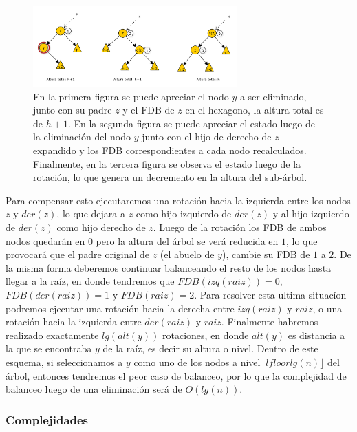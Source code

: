\begin{figure}
 \centering
 \includegraphics[width=0.70\textwidth]{graficos/PeorCasoEliminacionAVL.pdf}
 \caption*{\newline \footnotesize En la primera figura se puede apreciar el nodo $y$ a ser eliminado, junto con su padre $z$ y el FDB de $z$ en el hexagono, la altura total es de $h+1$. En la segunda figura se puede apreciar el estado luego de la eliminaci\'on del nodo $y$ junto con el hijo de derecho de $z$ expandido y los FDB correspondientes a cada nodo recalculados. Finalmente, en la tercera figura se observa el estado luego de la rotaci\'on, lo que genera un decremento en la altura del sub-\'arbol.}
\end{figure}

Para compensar esto ejecutaremos una rotaci\'on hacia la izquierda entre los nodos $z$ y $der(z)$, lo que dejara a $z$ como hijo izquierdo de $der(z)$ y al hijo izquierdo de $der(z)$ como hijo derecho de $z$. Luego de la rotaci\'on los FDB de ambos nodos quedar\'an en $0$ pero la altura del \'arbol se ver\'a reducida en $1$, lo que provocar\'a que el padre original de $z$ (el abuelo de $y$), cambie su FDB de $1$ a $2$. De la misma forma deberemos continuar balanceando el resto de los nodos hasta llegar a la ra\'iz, en donde tendremos que $FDB(izq(raiz)) = 0$, $FDB(der(raiz)) = 1$ y $FDB(raiz) = 2$. Para resolver esta ultima situac\'ion podremos ejecutar una rotaci\'on hacia la derecha entre $izq(raiz)$ y $raiz$, o una rotaci\'on hacia la izquierda entre $der(raiz)$ y $raiz$. Finalmente habremos realizado exactamente $lg(alt(y))$ rotaciones, en donde $alt(y)$ es distancia a la que se encontraba $y$ de la ra\'iz, es decir su altura o nivel. Dentro de este esquema, si seleccionamos a $y$ como uno de los nodos a 
nivel $\
lfloor lg(n) \rfloor$ del \'arbol, entonces tendremos el peor caso de balanceo, por lo que la complejidad de balanceo luego de una eliminaci\'on ser\'a de $O(lg(n))$.

\subsubsection{Complejidades}

